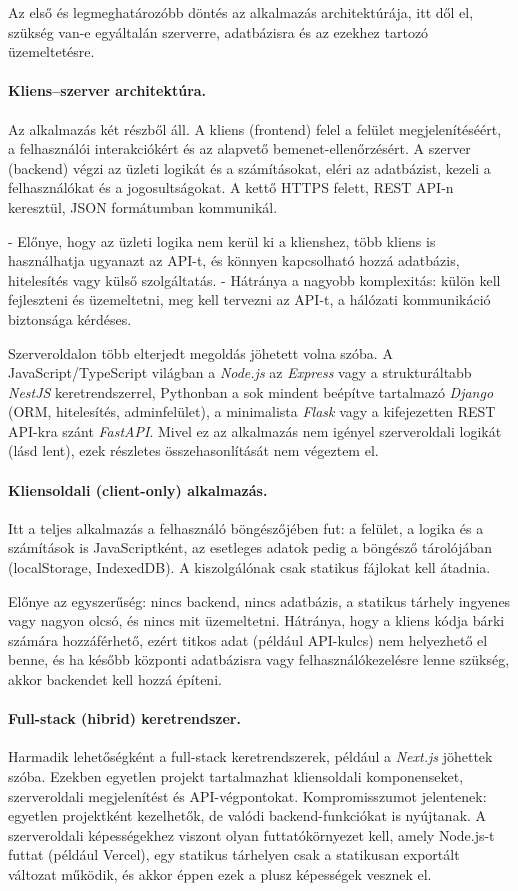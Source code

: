 Az első és legmeghatározóbb döntés az alkalmazás architektúrája, itt dől el,
 szükség van-e egyáltalán szerverre, adatbázisra és az
ezekhez tartozó üzemeltetésre.

\paragraph{Kliens--szerver architektúra.}
Az alkalmazás két részből áll. A kliens
(frontend) felel a felület megjelenítéséért, a felhasználói
interakciókért és az alapvető bemenet-ellenőrzésért. A szerver
(backend) végzi az üzleti logikát és a számításokat, eléri az
adatbázist, kezeli a felhasználókat és a jogosultságokat. A kettő
HTTPS felett, REST API-n keresztül, JSON formátumban
kommunikál.

- Előnye, hogy az üzleti logika nem kerül ki a klienshez, több kliens
is használhatja ugyanazt az API-t, és könnyen kapcsolható hozzá
adatbázis, hitelesítés vagy külső szolgáltatás. 
- Hátránya a nagyobb komplexitás: külön kell fejleszteni és üzemeltetni,
meg kell tervezni az API-t, a hálózati kommunikáció
biztonsága kérdéses.

Szerveroldalon több elterjedt megoldás jöhetett volna szóba. A
JavaScript/TypeScript világban a \emph{Node.js} az \emph{Express}
vagy a strukturáltabb \emph{NestJS} keretrendszerrel, Pythonban a
sok mindent beépítve tartalmazó \emph{Django} (ORM, hitelesítés,
adminfelület), a minimalista \emph{Flask} vagy a kifejezetten REST
API-kra szánt \emph{FastAPI}. Mivel ez az alkalmazás nem igényel
szerveroldali logikát (lásd lent), ezek részletes összehasonlítását
nem végeztem el.

\paragraph{Kliensoldali (client-only) alkalmazás.}
Itt a teljes alkalmazás a felhasználó böngészőjében fut: a felület,
a logika és a számítások is JavaScriptként, az esetleges adatok pedig
a böngésző tárolójában (localStorage, IndexedDB). A kiszolgálónak
csak statikus fájlokat kell átadnia.

Előnye az egyszerűség: nincs backend, nincs adatbázis, a statikus
tárhely ingyenes vagy nagyon olcsó, és nincs mit üzemeltetni.
Hátránya, hogy a kliens kódja bárki számára hozzáférhető, ezért
titkos adat (például API-kulcs) nem helyezhető el benne, és ha
később központi adatbázisra vagy felhasználókezelésre lenne szükség,
akkor backendet kell hozzá építeni.

\paragraph{Full-stack (hibrid) keretrendszer.}
Harmadik lehetőségként a full-stack keretrendszerek, például a
\emph{Next.js} jöhettek szóba. Ezekben egyetlen projekt tartalmazhat
kliensoldali komponenseket, szerveroldali megjelenítést és
API-végpontokat. Kompromisszumot jelentenek: egyetlen projektként
kezelhetők, de valódi backend-funkciókat is nyújtanak. A
szerveroldali képességekhez viszont olyan futtatókörnyezet kell,
amely Node.js-t futtat (például Vercel), egy statikus tárhelyen
csak a statikusan exportált változat működik, és akkor éppen ezek a
plusz képességek vesznek el.

